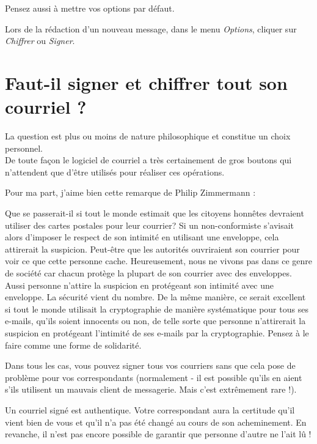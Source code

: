 Pensez aussi à mettre vos options par défaut.

Lors de la rédaction d'un nouveau message, dans le menu \emph{Options},
cliquer sur \emph{Chiffrer} ou \emph{Signer}.

\section{Faut-il signer et chiffrer tout son courriel ?}\label{faut-il-signer-et-chiffrer-tout-son-courriel}

La question est plus ou moins de nature philosophique et constitue un
choix personnel.\\De toute façon le logiciel de courriel a très
certainement de gros boutons qui n'attendent que d'être utilisés pour
réaliser ces opérations.

Pour ma part, j'aime bien cette remarque de Philip Zimmermann :

\begin{quoting}
Que se passerait-il si tout le monde estimait que les citoyens honnêtes
devraient utiliser des cartes postales pour leur courrier? Si un
non-conformiste s'avisait alors d'imposer le respect de son intimité en
utilisant une enveloppe, cela attirerait la suspicion. Peut-être que les
autorités ouvriraient son courrier pour voir ce que cette personne
cache. Heureusement, nous ne vivons pas dans ce genre de société car
chacun protège la plupart de son courrier avec des enveloppes. Aussi
personne n'attire la suspicion en protégeant son intimité avec une
enveloppe. La sécurité vient du nombre. De la même manière, ce serait
excellent si tout le monde utilisait la cryptographie de manière
systématique pour tous ses e-mails, qu'ils soient innocents ou non, de
telle sorte que personne n'attirerait la suspicion en protégeant
l'intimité de ses e-mails par la cryptographie. Pensez à le faire comme
une forme de solidarité.
\end{quoting}

Dans tous les cas, vous pouvez signer tous vos courriers sans que cela
pose de problème pour vos correspondants (normalement - il est possible
qu'ils en aient s'ils utilisent un mauvais client de messagerie. Mais
c'est extrêmement rare !).

Un courriel signé est authentique. Votre correspondant aura la
certitude qu'il vient bien de vous et qu'il n'a pas été changé au cours
de son acheminement. En revanche, il n'est pas encore possible de
garantir que personne d'autre ne l'ait lû !

